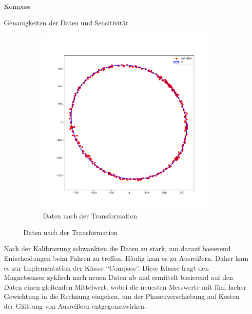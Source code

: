 \documentclass[12pt]{report}
\begin{document}
\begin{section}{Kompass}
\begin{subsection}{Genauigkeiten der Daten und Sensitivität}
\begin{figure}[h!]
\begin{subfigure}{0.45\linewidth}
      \includegraphics[width=\linewidth]{lernportfolio_assets/MagnetDatenAlsKreis.png}
      \caption{Daten nach der Transformation}
    \end{subfigure}
  \end{figure}
  
  Nach der Kalibrierung schwankten die Daten zu stark, um darauf basierend
  Entscheidungen beim Fahren zu treffen. Häufig kam es zu Ausreißern. Daher kam
  es zur Implementation der Klasse ``Compass''. Diese Klasse fragt den
  Magnetsensor zyklisch nach neuen Daten ab und ermittelt basierend auf den
  Daten einen gleitenden Mittelwert, wobei die neuesten Messwerte mit fünf facher
  Gewichtung in die Rechnung eingehen, um der Phasenverschiebung auf Kosten der
  Glättung von Ausreißern entgegenzuwirken.


\end{subsection}
\end{section}
\end{document}
